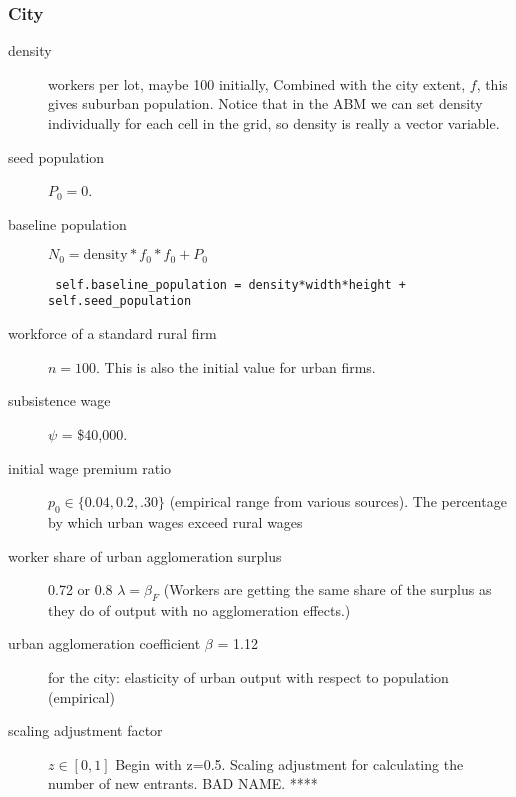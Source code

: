 \subsubsection{City}
\begin{description}
\item [density] workers per lot, maybe 100 initially, Combined with the city extent, $f$, this gives suburban population. %
Notice that in the ABM we can set density individually for each cell in the grid, so density is really a vector variable.  %
\item [seed population] $P_0=0$. %
\item [baseline population]  $N_0=\mathrm{density} * f_0 * f_0 + P_0$ 
\begin{lstlisting}
 self.baseline_population = density*width*height + self.seed_population
\end{lstlisting}

\item [workforce of a standard rural firm] $n=100$. This is also the initial value for urban firms.


\item [subsistence wage] $\psi$ = \$40,000. %


\item [initial wage premium ratio] $p_0\in\{0.04,0.2,.30\}$ (empirical range from various sources). The percentage by which urban wages exceed rural wages 

\item [worker share of urban agglomeration surplus] 0.72 or 0.8 $\lambda=\beta_F$ (Workers are getting the same share of the surplus as they do of output with no agglomeration effects.) 
\item [urban agglomeration coefficient $\beta$ = 1.12] for the city: elasticity of urban output with respect to population (empirical)

\item [scaling adjustment factor] $z\in[0,1]$ Begin with z=0.5. Scaling adjustment for calculating the number of new entrants. BAD NAME. ****


\end{description}
